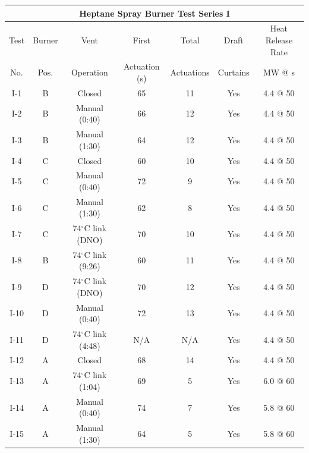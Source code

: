 \begin{table}[h!]
\begin{center}
\begin{tabular}{|c||c|c|c|c|c|c|}
\hline
\multicolumn{7}{|c|}{\bf Heptane Spray Burner Test Series I}  \\ \hline \hline
Test & Burner & Vent                    & First         & Total      & Draft    & Heat Release Rate \\
No.  & Pos.   & Operation               & Actuation (s) & Actuations & Curtains & MW @ s \\
\hline \hline
I-1   & B  & Closed                     & 65            & 11        & Yes  & 4.4 @ 50  \\ \hline
I-2   & B  & Manual (0:40)              & 66            & 12        & Yes  & 4.4 @ 50  \\ \hline
I-3   & B  & Manual (1:30)              & 64            & 12        & Yes  & 4.4 @ 50  \\ \hline
I-4   & C  & Closed                     & 60            & 10        & Yes  & 4.4 @ 50  \\ \hline
I-5   & C  & Manual (0:40)              & 72            & 9         & Yes  & 4.4 @ 50  \\ \hline
I-6   & C  & Manual (1:30)              & 62            & 8         & Yes  & 4.4 @ 50  \\ \hline
I-7   & C  & 74$^\circ$C link (DNO)     & 70            & 10        & Yes  & 4.4 @ 50  \\ \hline
I-8   & B  & 74$^\circ$C link (9:26)    & 60            & 11        & Yes  & 4.4 @ 50  \\ \hline
I-9   & D  & 74$^\circ$C link (DNO)     & 70            & 12        & Yes  & 4.4 @ 50  \\ \hline
I-10  & D  & Manual (0:40)              & 72            & 13        & Yes  & 4.4 @ 50  \\ \hline
I-11  & D  & 74$^\circ$C link (4:48)    & N/A           & N/A       & Yes  & 4.4 @ 50  \\ \hline
I-12  & A  & Closed                     & 68            & 14        & Yes  & 4.4 @ 50  \\ \hline
I-13  & A  & 74$^\circ$C link (1:04)    & 69            & 5         & Yes  & 6.0 @ 60  \\ \hline
I-14  & A  & Manual (0:40)              & 74            & 7         & Yes  & 5.8 @ 60  \\ \hline
I-15  & A  & Manual (1:30)              & 64            & 5         & Yes  & 5.8 @ 60  \\ \hline

\end{tabular}
\end{center}
\end{table}
